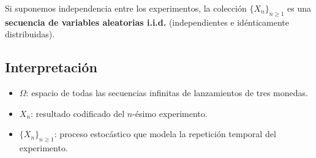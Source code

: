 \documentclass[12pt]{article}
\begin{document}
Si suponemos independencia entre los experimentos, la colección
$\{X_n\}_{n \geq 1}$ es una \textbf{secuencia de variables aleatorias i.i.d.}
(independientes e idénticamente distribuidas).

\subsection{Interpretación}

\begin{itemize}
    \item $\Omega$: espacio de todas las secuencias infinitas de lanzamientos de tres monedas.
    \item $X_n$: resultado codificado del $n$-ésimo experimento.
    \item $\{X_n\}_{n \geq 1}$: proceso estocástico que modela la repetición temporal del experimento.
\end{itemize}
\end{document}
